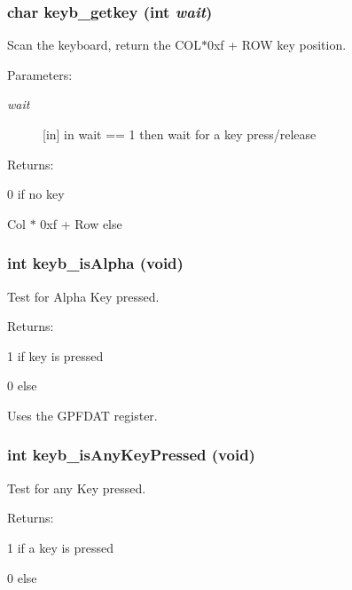 \subsubsection{\setlength{\rightskip}{0pt plus 5cm}char keyb\_\-getkey (int {\em wait})}\label{hpkeyb49_8h_a11}


Scan the keyboard, return the COL$\ast$0xf + ROW key position.

\begin{Desc}
\item[Parameters: ]\par
\begin{description}
\item[{\em 
wait}][in] in wait == 1 then wait for a key press/release \end{description}
\end{Desc}
\begin{Desc}
\item[Returns: ]\par
0 if no key \par
 Col $\ast$ 0xf + Row else \end{Desc}
\subsubsection{\setlength{\rightskip}{0pt plus 5cm}int keyb\_\-is\-Alpha (void)}\label{hpkeyb49_8h_a7}


Test for Alpha Key pressed.

\begin{Desc}
\item[Returns: ]\par
1 if key is pressed \par
 0 else\end{Desc}
Uses the GPFDAT register. 
\subsubsection{\setlength{\rightskip}{0pt plus 5cm}int keyb\_\-is\-Any\-Key\-Pressed (void)}\label{hpkeyb49_8h_a1}


Test for any Key pressed.

\begin{Desc}
\item[Returns: ]\par
1 if a key is pressed \par
 0 else \end{Desc}
